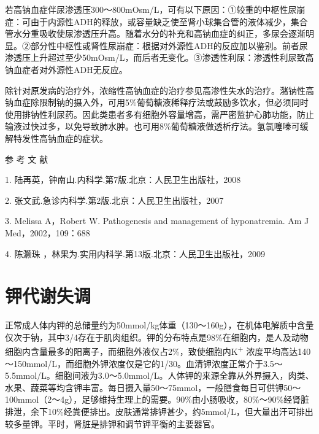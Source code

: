 若高钠血症伴尿渗透压300～800mOsm/L，可有以下原因：①较重的中枢性尿崩症：可由于内源性ADH的释放，或容量缺乏使至肾小球集合管的液体减少，集合管水分重吸收使尿渗透压升高。随着水分的补充和高钠血症的纠正，多尿会逐渐明显。②部分性中枢性或肾性尿崩症：根据对外源性ADH的反应加以鉴别。前者尿渗透压上升超过至少50mOsm/L，而后者无变化。③渗透性利尿：渗透性利尿致高钠血症者对外源性ADH无反应。

除针对原发病的治疗外，浓缩性高钠血症的治疗参见高渗性失水的治疗。潴钠性高钠血症除限制钠的摄入外，可用5\%葡萄糖液稀释疗法或鼓励多饮水，但必须同时使用排钠性利尿药。因此类患者多有细胞外容量增高，需严密监护心肺功能，防止输液过快过多，以免导致肺水肿。也可用8\%葡萄糖液做透析疗法。氢氯噻嗪可缓解特发性高钠血症的症状。

\protect\hypertarget{text00194.html}{}{}

\hypertarget{text00194.htmlux5cux23CHP6-1-5}{}
参 考 文 献

1. 陆再英，钟南山.内科学.第7版.北京：人民卫生出版社，2008

2. 张文武.急诊内科学.第2版.北京：人民卫生出版社，2007

3. Melissa A，Robert W. Pathogenesis and management of hyponatremia. Am
J Med，2002，109：688

4. 陈灏珠 ，林果为.实用内科学.第13版.北京：人民卫生出版社，2009

\protect\hypertarget{text00195.html}{}{}

\chapter{钾代谢失调}

正常成人体内钾的总储量约为50mmol/kg体重（130～160g），在机体电解质中含量仅次于钠，其中3/4存在于肌肉组织。钾的分布特点是98\%在细胞内，是人及动物细胞内含量最多的阳离子，而细胞外液仅占2\%，致使细胞内K\textsuperscript{+}
浓度平均高达140～150mmol/L，而细胞外钾浓度仅是它的1/30。血清钾浓度正常介于3.5～5.5mmol/L。细胞间液为3.0～5.0mmol/L。人体钾的来源全靠从外界摄入，肉类、水果、蔬菜等均含钾丰富。每日摄入量50～75mmol，一般膳食每日可供钾50～100mmol（2～4g），足够维持生理上的需要。90\%由小肠吸收，80\%～90\%经肾脏排泄，余下10\%经粪便排出。皮肤通常排钾甚少，约5mmol/L，但大量出汗可排出较多量钾。平时，肾脏是排钾和调节钾平衡的主要器官。

